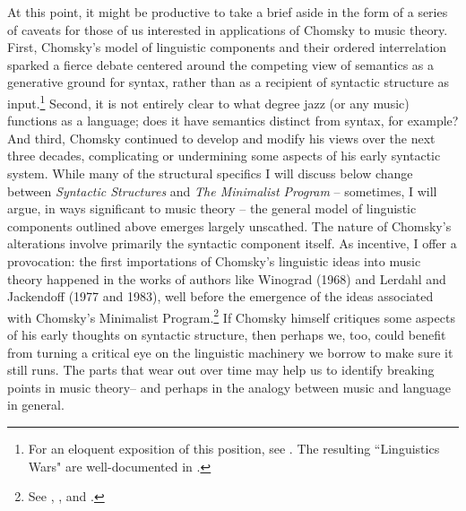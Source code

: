At this point, it might be productive to take a brief aside in the form of a series of caveats for those of us interested in applications of Chomsky to music theory.  First, Chomsky's model of linguistic components and their ordered interrelation sparked a fierce debate centered around the competing view of semantics as a generative ground for syntax, rather than as a recipient of syntactic structure as input.\footnote{For an eloquent exposition of this position, see \cite{jackendoff1992}.  The resulting ``Linguistics Wars" are well-documented in \cite{harris1995}.}  Second, it is not entirely clear to what degree jazz (or any music) functions as a language; does it have semantics distinct from syntax, for example?  And third, Chomsky continued to develop and modify his views over the next three decades, complicating or undermining some aspects of his early syntactic system.  While many of the structural specifics I will discuss below change between \emph{Syntactic Structures} and \emph{The Minimalist Program} -- sometimes, I will argue, in ways significant to music theory -- the general model of linguistic components outlined above emerges largely unscathed.  The nature of Chomsky's alterations involve primarily the syntactic component itself.  As incentive, I offer a provocation: the first importations of Chomsky's linguistic ideas into music theory happened in the works of authors like Winograd (1968) and Lerdahl and Jackendoff (1977 and 1983), well before the emergence of the ideas associated with Chomsky's Minimalist Program.\footnote{See \cite{winograd1968}, \cite{lj1977}, and \cite{lj1983}.}  If Chomsky himself critiques some aspects of his early thoughts on syntactic structure, then perhaps we, too, could benefit from turning a critical eye on the linguistic machinery we borrow to make sure it still runs.  The parts that wear out over time may help us to identify breaking points in music theory-- and perhaps in the analogy between music and language in general.

